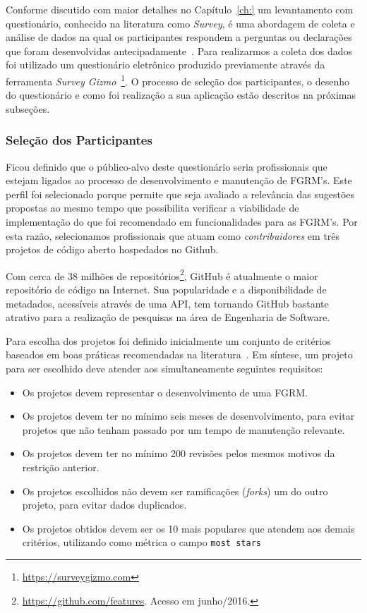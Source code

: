Conforme discutido com maior detalhes no Capítulo~\ref{ch:} um levantamento com
questionário, conhecido na literatura como \textit{Survey}, é uma abordagem de
coleta e análise de dados na qual os participantes respondem a perguntas ou
declarações que foram desenvolvidas antecipadamente~\cite{kasunic2005designing}.
Para realizarmos a coleta dos dados foi utilizado um questionário eletrônico
produzido previamente através da ferramenta \textit{Survey
	Gizmo}~\footnote{\url{https://surveygizmo.com}}. O processo de seleção dos
participantes, o desenho do questionário e como foi realização a sua aplicação
estão descritos na próximas subseções.

\subsubsection{Seleção dos Participantes}
\label{ssub:sug_melhoria_selecao_participantes}

Ficou definido que o público-alvo deste questionário seria profissionais que
estejam ligados ao processo de desenvolvimento e manutenção de FGRM's. Este
perfil foi selecionado porque permite que seja avaliado a relevância das
sugestões propostas ao mesmo tempo que possibilita verificar a viabilidade de
implementação do que foi recomendado em funcionalidades para as FGRM's. Por esta
razão, selecionamos profissionais que atuam como \textit{contribuidores} em três
projetos de código aberto hospedados no Github.


Com cerca de 38 milhões de
repositórios\footnote{\url{https://github.com/features}. Acesso em junho/2016.},
GitHub é atualmente o maior repositório de código na Internet. Sua popularidade
e a disponibilidade de metadados, acessíveis através de uma API, tem tornando
GitHub bastante atrativo para a realização de pesquisas na área de Engenharia de
Software.

Para escolha dos projetos foi definido inicialmente um conjunto de critérios
baseados em boas práticas recomendadas na literatura~\cite{Bird2009}. Em
síntese, um projeto para ser escolhido deve atender aos simultaneamente
seguintes requisitos:

\begin{itemize}
	\item Os projetos devem representar o desenvolvimento de uma FGRM\@.
	\item Os projetos devem ter no mínimo seis meses de desenvolvimento, para
		evitar projetos que não tenham passado por um tempo de manutenção
		relevante.
	\item Os  projetos devem  ter  no  mínimo  200  revisões  pelos  mesmos
		motivos  da restrição anterior.
	\item Os projetos escolhidos não devem ser ramificações (\textsl{forks}) um
		do outro projeto, para evitar dados duplicados.
	\item Os projetos obtidos devem ser os 10 mais populares que atendem aos
		demais critérios, utilizando como métrica o campo \texttt{most stars}
\end{itemize}

